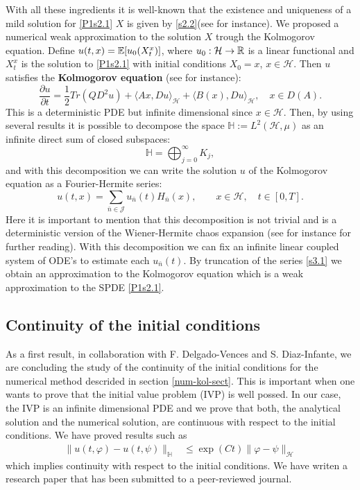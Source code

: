 \documentclass{article}
\numberwithin{equation}{section}
\begin{document}
With all these ingredients it is well-known that the existence and uniqueness of a mild solution for \eqref{P1s2.1} $X$ is given 
by \eqref{s2.2}(see \cite{da-za1} for instance). We proposed a numerical weak approximation to the solution $X$ trough the Kolmogorov
equation. Define $u(t,x)=\mathbb{E}[u_0(X_t^x) ] $, where $u_0:\mathcal{H}\rightarrow {\mathbb R}$ is a linear functional and $X_t^x$ 
is the solution to \eqref{P1s2.1} with initial conditions $X_0=x$, $x\in\mathcal{H}$.  Then $u$ satisfies the 
{\bf Kolmogorov equation}  (see \cite{da-za} for instance):
\begin{equation}
\label{P1s2.3}
\frac{\partial u}{\partial t}= \frac{1}{2}Tr(QD^2u)+ \langle Ax, Du \rangle_\mathcal{H} + \langle B(x),Du \rangle_\mathcal{H},\quad x\in D(A).
\end{equation} 
This is a deterministic PDE but infinite dimensional since $x\in \mathcal{H}$. Then, by using several results it is possible to 
decompose the space $\mathbb{H}:=L^2( \mathcal{H},\mu)$ as an infinite direct sum of closed subspaces:
 \[
\mathbb{H} = \bigoplus_{j=0}^\infty K_j,
\]
and with this decomposition we can write the solution $u$ of the Kolmogorov equation as a Fourier-Hermite series:
\begin{equation}
\label{s3.1}
u(t,x) =  \sum_{\bar{n}\in \mathcal{J}} u_{\bar{n}}(t) H_{\bar{n}}(x), \qquad x\in\mathcal{H},\quad t\in[0,T].
\end{equation}
Here it is important to mention that this decomposition is not trivial and is a deterministic version 
of the Wiener-Hermite chaos expansion (see for instance \cite{lo-ro} for further reading).
With this decomposition  we can fix an infinite linear coupled system of ODE's to estimate each $u_{\bar{n}}(t)$. By truncation of 
the series \eqref{s3.1} we obtain an approximation to the Kolmogorov equation which is a weak approximation to 
the SPDE \eqref{P1s2.1}.




\subsection{Continuity of the initial conditions}
 As a first result, in collaboration
with F. Delgado-Vences and S. Diaz-Infante, we are concluding the 
study of the continuity of the initial conditions for the numerical method descrided in section \ref{num-kol-sect}. This is important when one wants to prove that the initial
value problem (IVP) is well possed. In our case, the IVP is an infinite dimensional PDE and we prove that both, the analytical solution and 
the numerical solution, are continuous with respect to the initial conditions. We have proved results such as
\begin{align*}
\|  u(t,\varphi)-u(t,\psi)\|_{\mathbb{H} } &\le \exp(Ct)  \|  \varphi - \psi\|_\mathcal{H} 
\end{align*}
which implies continuity with respect to the initial conditions. We have writen a research paper that has been submitted to a peer-reviewed journal.
\end{document}
